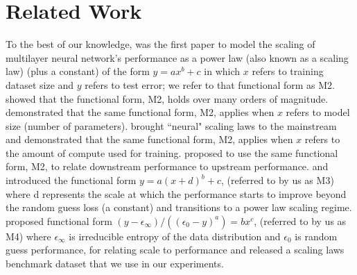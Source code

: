 \documentclass{article} %
\newcommand{\ir}[1]		{{ \textcolor{blue} { #1}}}
\begin{document}
\section{Related Work}
\vspace{-3.1mm}
To the best of our knowledge, \citet{cortes1994learning} was the first paper to model the scaling of multilayer neural network's performance as a power law (also known as a scaling law) (plus a constant)
of the form $y=ax^b + c$ in which $x$ refers to training dataset size and $y$ refers to test error; we refer to that functional form as M2. \citet{2017arXiv171200409H} showed that the functional form, M2, holds over many orders of magnitude. \citet{DBLP:journals/corr/abs-1909-12673} demonstrated  that the same functional form, M2, applies when $x$ refers to model size (number of parameters). \citet{icm2020arXiv200108361K} brought ``neural" scaling laws to the mainstream and demonstrated that the same functional form, M2, applies when $x$ refers to the amount of compute used for training. \citet{abnar2021exploring} proposed to use the same functional form, M2, to relate downstream performance to upstream performance. \citet{DBLP:journals/corr/abs-2106-04560} and \cite{bansal2022data} introduced the functional form $y=a(x+d)^b + c$, (referred to by us as M3) where  d represents the scale at which the performance starts to improve beyond the  random guess loss (a constant) and transitions to a  power law scaling regime. \citet{Alabdulmohsi2022revisiting} proposed functional form $(y - \epsilon_{\infty}) / ((\epsilon_{0} - y)^a) = bx^c$, (referred to by us as M4) where  $\epsilon_{\infty}$ is irreducible entropy of the data distribution and $\epsilon_{0}$ is random guess performance, for relating scale to performance and released a scaling laws benchmark dataset that we use in our experiments. %

\vspace{-1.2mm}

\end{document}
